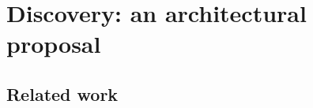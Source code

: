 \section{Discovery: an architectural proposal}
\label{sec:architecture}

\subsection{Related work}


	







				





